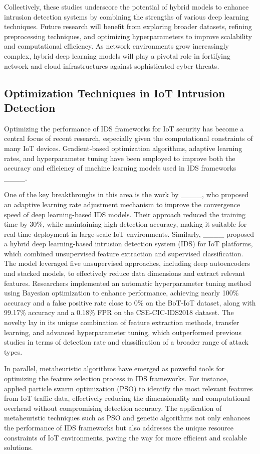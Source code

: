 Collectively, these studies underscore the potential of hybrid models to enhance intrusion detection systems by combining the strengths of various deep learning techniques. Future research will benefit from exploring broader datasets, refining preprocessing techniques, and optimizing hyperparameters to improve scalability and computational efficiency. As network environments grow increasingly complex, hybrid deep learning models will play a pivotal role in fortifying network and cloud infrastructures against sophisticated cyber threats.

\subsection{Optimization Techniques in IoT Intrusion Detection}
Optimizing the performance of IDS frameworks for IoT security has become a central focus of recent research, especially given the computational constraints of many IoT devices. Gradient-based optimization algorithms, adaptive learning rates, and hyperparameter tuning have been employed to improve both the accuracy and efficiency of machine learning models used in IDS frameworks ____.

One of the key breakthroughs in this area is the work by ____, who proposed an adaptive learning rate adjustment mechanism to improve the convergence speed of deep learning-based IDS models. Their approach reduced the training time by 30\%, while maintaining high detection accuracy, making it suitable for real-time deployment in large-scale IoT environments. Similarly, ____ proposed a hybrid deep learning-based intrusion detection system (IDS) for IoT platforms, which combined unsupervised feature extraction and supervised classification. The model leveraged five unsupervised approaches, including deep autoencoders and stacked models, to effectively reduce data dimensions and extract relevant features. Researchers implemented an automatic hyperparameter tuning method using Bayesian optimization to enhance performance, achieving nearly 100\% accuracy and a false positive rate close to 0\% on the BoT-IoT dataset, along with 99.17\% accuracy and a 0.18\% FPR on the CSE-CIC-IDS2018 dataset. The novelty lay in its unique combination of feature extraction methods, transfer learning, and advanced hyperparameter tuning, which outperformed previous studies in terms of detection rate and classification of a broader range of attack types.

In parallel, metaheuristic algorithms have emerged as powerful tools for optimizing the feature selection process in IDS frameworks. For instance, ____ applied particle swarm optimization (PSO) to identify the most relevant features from IoT traffic data, effectively reducing the dimensionality and computational overhead without compromising detection accuracy. The application of metaheuristic techniques such as PSO and genetic algorithms not only enhances the performance of IDS frameworks but also addresses the unique resource constraints of IoT environments, paving the way for more efficient and scalable solutions.

